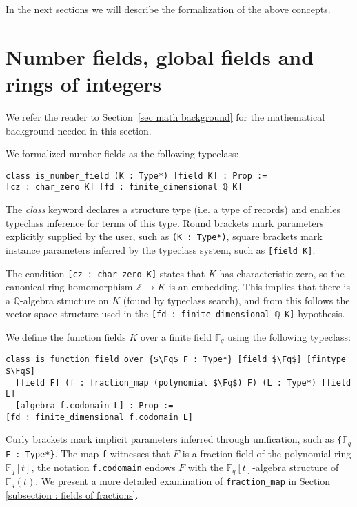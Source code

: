 \documentclass[a4paper,USenglish,cleveref, autoref, thm-restate]{lipics-v2021}
\newcommand{\lean}[1]{\texttt{#1}\xspace} %
\newcommand*{\Fq}[1][q]{\mathbb{F}_{#1}}
\newcommand{\Q}{\mathbb{Q}}
\newcommand{\Z}{\mathbb{Z}}
\begin{document}
In the next sections we will describe the formalization of the above concepts.

\section{Number fields, global fields and rings of integers}

We refer the reader to Section~\ref{sec math background} for the mathematical background needed in this section.

We formalized number fields as the following typeclass:
\begin{lstlisting}
class is_number_field (K : Type*) [field K] : Prop :=
[cz : char_zero K] [fd : finite_dimensional ℚ K]
\end{lstlisting}
The \emph{class} keyword declares a structure type (i.e. a type of records) and enables typeclass inference for terms of this type.
Round brackets mark parameters explicitly supplied by the user, such as \lean{(K : Type*)},
square brackets mark instance parameters inferred by the typeclass system, such as \lean{[field K]}.

The condition \lean{[cz : char\_zero K]} states that $K$ has characteristic zero, so the canonical ring homomorphism $\Z \to K$ is an embedding.
This implies that there is a $\Q$-algebra structure on $K$ (found by typeclass search),
and from this follows the vector space structure used in the \lean{[fd : finite\_dimensional ℚ K]} hypothesis.

We define the function fields $K$ over a finite field $\Fq$ using the following typeclass:
\begin{lstlisting}
class is_function_field_over {$\Fq$ F : Type*} [field $\Fq$] [fintype $\Fq$]
  [field F] (f : fraction_map (polynomial $\Fq$) F) (L : Type*) [field L]
  [algebra f.codomain L] : Prop :=
[fd : finite_dimensional f.codomain L]
\end{lstlisting}
Curly brackets mark implicit parameters inferred through unification, such as \lean{\{$\Fq$ F : Type*\}}.
The map \lean{f} witnesses that $F$ is a fraction field of the polynomial ring $\Fq[q][t]$,
the notation \lean{f.codomain} endows $F$ with the $\Fq[q][t]$-algebra structure of $\Fq(t)$. We present a more detailed examination of \lean{fraction\_map} in Section \ref{subsection : fields of fractions}.
\end{document}
